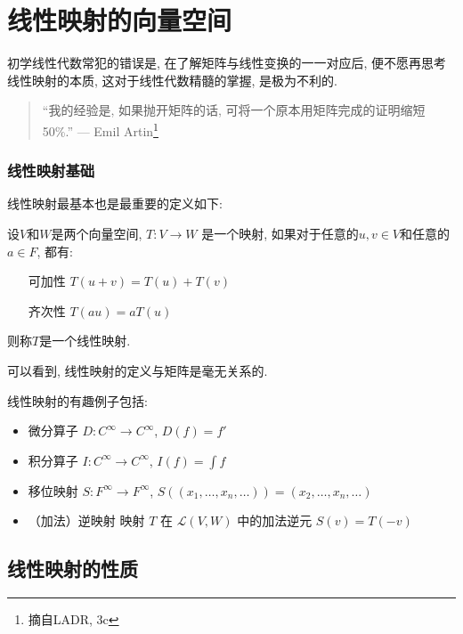\section{线性映射的向量空间}
初学线性代数常犯的错误是, 在了解矩阵与线性变换的一一对应后, 便不愿再思考线性映射的本质, 这对于线性代数精髓的掌握, 是极为不利的.
\begin{quote}
    ``我的经验是, 如果抛开矩阵的话, 可将一个原本用矩阵完成的证明缩短 50\%.''
    \hfill --- Emil Artin\footnote{摘自LADR, 3c}
\end{quote}
\subsubsection{线性映射基础}
线性映射最基本也是最重要的定义如下:
\begin{definition}
    设\(V\)和\(W\)是两个向量空间, \(T: V \to W\) 是一个映射, 如果对于任意的\(u,
    v \in V\)和任意的\(a \in F\), 都有:
    \begin{itemize}
        \item[可加性] \(T(u+v)=T(u)+T(v)\)
        \item[齐次性] \(T(a u) = a T(u)\)
    \end{itemize}
    则称\(T\)是一个线性映射.
\end{definition}
可以看到, 线性映射的定义与矩阵是毫无关系的.

线性映射的有趣例子包括:
\begin{itemize}
    \item 微分算子 \(D: C^{\infty} \to C^{\infty}\), \(D(f) = f'\)
    \item 积分算子 \(I: C^{\infty} \to C^{\infty}\), \(I(f) = \int f\)
    \item 移位映射 \(S: F^{\infty} \to F^{\infty}\),
        \(S((x_{1},\ldots, x_{n}, \ldots)) = (x_{2},\ldots,
        x_{n}, \ldots)\)
    \item （加法）逆映射 映射 \(T\) 在 \(\mathcal{L}(V,W)\) 中的加法逆元
        \(S(v)=T(-v)\)
\end{itemize}
\subsection{线性映射的性质}
